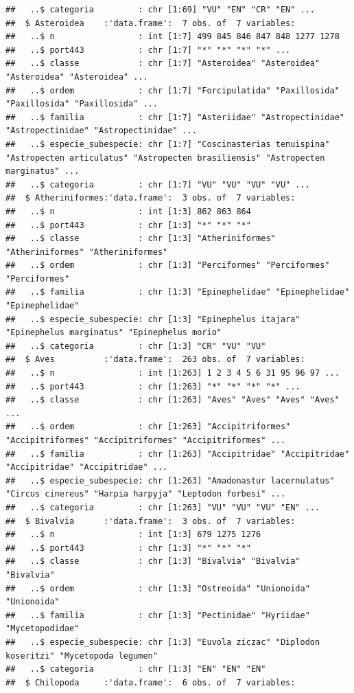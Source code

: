 \documentclass[
]{article}
\begin{document}
\begin{verbatim}
##   ..$ categoria         : chr [1:69] "VU" "EN" "CR" "EN" ...
##  $ Asteroidea    :'data.frame':  7 obs. of  7 variables:
##   ..$ n                 : int [1:7] 499 845 846 847 848 1277 1278
##   ..$ port443           : chr [1:7] "*" "*" "*" "*" ...
##   ..$ classe            : chr [1:7] "Asteroidea" "Asteroidea" "Asteroidea" "Asteroidea" ...
##   ..$ ordem             : chr [1:7] "Forcipulatida" "Paxillosida" "Paxillosida" "Paxillosida" ...
##   ..$ familia           : chr [1:7] "Asteriidae" "Astropectinidae" "Astropectinidae" "Astropectinidae" ...
##   ..$ especie_subespecie: chr [1:7] "Coscinasterias tenuispina" "Astropecten articulatus" "Astropecten brasiliensis" "Astropecten marginatus" ...
##   ..$ categoria         : chr [1:7] "VU" "VU" "VU" "VU" ...
##  $ Atheriniformes:'data.frame':  3 obs. of  7 variables:
##   ..$ n                 : int [1:3] 862 863 864
##   ..$ port443           : chr [1:3] "*" "*" "*"
##   ..$ classe            : chr [1:3] "Atheriniformes" "Atheriniformes" "Atheriniformes"
##   ..$ ordem             : chr [1:3] "Perciformes" "Perciformes" "Perciformes"
##   ..$ familia           : chr [1:3] "Epinephelidae" "Epinephelidae" "Epinephelidae"
##   ..$ especie_subespecie: chr [1:3] "Epinephelus itajara" "Epinephelus marginatus" "Epinephelus morio"
##   ..$ categoria         : chr [1:3] "CR" "VU" "VU"
##  $ Aves          :'data.frame':  263 obs. of  7 variables:
##   ..$ n                 : int [1:263] 1 2 3 4 5 6 31 95 96 97 ...
##   ..$ port443           : chr [1:263] "*" "*" "*" "*" ...
##   ..$ classe            : chr [1:263] "Aves" "Aves" "Aves" "Aves" ...
##   ..$ ordem             : chr [1:263] "Accipitriformes" "Accipitriformes" "Accipitriformes" "Accipitriformes" ...
##   ..$ familia           : chr [1:263] "Accipitridae" "Accipitridae" "Accipitridae" "Accipitridae" ...
##   ..$ especie_subespecie: chr [1:263] "Amadonastur lacernulatus" "Circus cinereus" "Harpia harpyja" "Leptodon forbesi" ...
##   ..$ categoria         : chr [1:263] "VU" "VU" "VU" "EN" ...
##  $ Bivalvia      :'data.frame':  3 obs. of  7 variables:
##   ..$ n                 : int [1:3] 679 1275 1276
##   ..$ port443           : chr [1:3] "*" "*" "*"
##   ..$ classe            : chr [1:3] "Bivalvia" "Bivalvia" "Bivalvia"
##   ..$ ordem             : chr [1:3] "Ostreoida" "Unionoida" "Unionoida"
##   ..$ familia           : chr [1:3] "Pectinidae" "Hyriidae" "Mycetopodidae"
##   ..$ especie_subespecie: chr [1:3] "Euvola ziczac" "Diplodon koseritzi" "Mycetopoda legumen"
##   ..$ categoria         : chr [1:3] "EN" "EN" "EN"
##  $ Chilopoda     :'data.frame':  6 obs. of  7 variables:

\end{verbatim}
\end{document}
